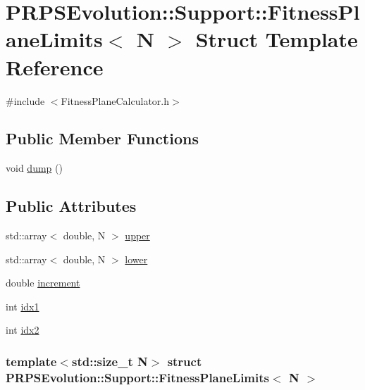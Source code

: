 \hypertarget{struct_p_r_p_s_evolution_1_1_support_1_1_fitness_plane_limits}{\section{\-P\-R\-P\-S\-Evolution\-:\-:\-Support\-:\-:\-Fitness\-Plane\-Limits$<$ \-N $>$ \-Struct \-Template \-Reference}
\label{struct_p_r_p_s_evolution_1_1_support_1_1_fitness_plane_limits}
}


{\ttfamily \#include $<$\-Fitness\-Plane\-Calculator.\-h$>$}

\subsection*{\-Public \-Member \-Functions}
\begin{DoxyCompactItemize}
\item 
void \hyperlink{struct_p_r_p_s_evolution_1_1_support_1_1_fitness_plane_limits_a81692cd425a65f2935cf8893d48df6c6}{dump} ()
\end{DoxyCompactItemize}
\subsection*{\-Public \-Attributes}
\begin{DoxyCompactItemize}
\item 
std\-::array$<$ double, \-N $>$ \hyperlink{struct_p_r_p_s_evolution_1_1_support_1_1_fitness_plane_limits_a029754ad04701b2c1163b7f240b060da}{upper}
\item 
std\-::array$<$ double, \-N $>$ \hyperlink{struct_p_r_p_s_evolution_1_1_support_1_1_fitness_plane_limits_a6fed33c6e47a2af70ebc068f5cf70c71}{lower}
\item 
double \hyperlink{struct_p_r_p_s_evolution_1_1_support_1_1_fitness_plane_limits_a17db1abd8c16e3f2bbc0bd18801be04f}{increment}
\item 
int \hyperlink{struct_p_r_p_s_evolution_1_1_support_1_1_fitness_plane_limits_acd363eaaed93d365ecfff41fea11faa7}{idx1}
\item 
int \hyperlink{struct_p_r_p_s_evolution_1_1_support_1_1_fitness_plane_limits_a374fd9e0855ef663a457a99492a9529f}{idx2}
\end{DoxyCompactItemize}
\subsubsection*{template$<$std\-::size\-\_\-t \-N$>$ struct P\-R\-P\-S\-Evolution\-::\-Support\-::\-Fitness\-Plane\-Limits$<$ N $>$}



